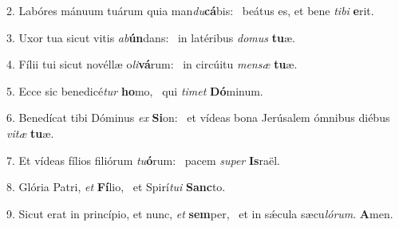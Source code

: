 2. Labóres mánuum tuárum quia man\textit{du}\textbf{cá}bis: \ast\  beátus es, et bene \textit{ti}\textit{bi} \textbf{e}rit.\

3. Uxor tua sicut vitis \textit{ab}\textbf{ún}dans: \ast\  in latéribus \textit{do}\textit{mus} \textbf{tu}æ.\

4. Fílii tui sicut novéllæ o\textit{li}\textbf{vá}rum: \ast\  in circúitu \textit{men}\textit{sæ} \textbf{tu}æ.\

5. Ecce sic benedicé\textit{tur} \textbf{ho}mo, \ast\  qui \textit{ti}\textit{met} \textbf{Dó}minum.\

6. Benedícat tibi Dóminus \textit{ex} \textbf{Si}on: \ast\  et vídeas bona Jerúsalem ómnibus diébus \textit{vi}\textit{tæ} \textbf{tu}æ.\

7. Et vídeas fílios filiórum \textit{tu}\textbf{ó}rum: \ast\  pacem \textit{su}\textit{per} \textbf{Is}raël.\

8. Glória Patri, \textit{et} \textbf{Fí}lio, \ast\  et Spirí\textit{tu}\textit{i} \textbf{Sanc}to.\

9. Sicut erat in princípio, et nunc, \textit{et} \textbf{sem}per, \ast\  et in sǽcula sæcu\textit{ló}\textit{rum}. \textbf{A}men.\

